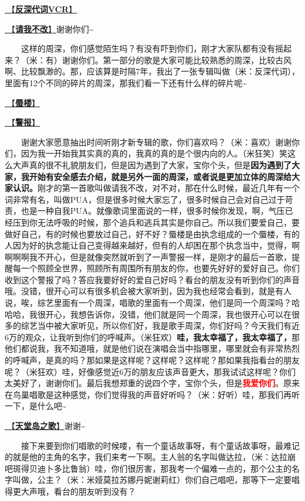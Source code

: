 \documentclass[]{ctexbook}
\begin{document}
\hyperref[senself-vcr]{🎥【\textbf{反深代词VCR}】}

\hyperref[brave-heart]{🎵【\textbf{请我不改}】}谢谢你们\textasciitilde{}

  这样的周深，你们感觉陌生吗？有没有吓到你们，刚才大家队都有没有摇起来？（米：有）谢谢你们。第一部分的歌是大家可能比较熟悉的周深，比较古风啊、比较飘渺的。那，应该算是时隔7年，我出了一张专辑叫做（米：反深代词），里面有12个不同的碎片的周深，那我们看一下还有什么样的碎片呢\textasciitilde{}

\hyperref[mirage]{🎵【\textbf{蜃楼}】}

\hyperref[the-giver]{🎵【\textbf{警报}】}

  谢谢大家愿意抽出时间听刚才新专辑的歌，你们喜欢吗？（米：喜欢）谢谢你们，因为我一开始我其实真的真的，我真的真的是个很内向的人。（米狂笑）笑这么大声真的很不礼貌朋友们，但是因为遇到了大家，宝你个头，但是\textbf{因为遇到了大家，我开始有安全感去介绍，就是另外一面的周深，或者说是更加立体的周深给大家认识。}刚才的第一首歌叫做请我不改，对不对，那在什么时候，最近几年有一个词非常有名，叫做PUA，但是很多时候大家忘了，很多时候自己会对自己过于苛责，也是一种自我PUA。就像歌词里面说的一样，很多时候你发现，啊，气压已经压到你无法呼吸的时候，那个追兵和逃兵其实是你自己。所以我们要爱自己，要做好自己，有的时候也要放过自己，好不好？蜃楼是由执念组成的一个蜃楼，有的人因为好的执念能让自己变得越来越好，但有的人却困在那个执念当中，觉得，啊啊啊啊我不开心，但是就像突然就听到了一声警报一样，是刚才的最后一首歌，提醒每一个照顾全世界，照顾所有周围所有朋友的你，也要先好好的爱好自己。你们收到这个警报了吗？答应我要好好的爱自己好吗？看台的朋友没有听到你们的声音哦。没错，很开心可以有很多机会被大家听到，因为我也经常会看到，就是有人说，唉，综艺里面有一个周深，唱歌的里面有一个周深，他们是同一个周深吗？哈哈哈，我很开心，我想告诉你，没错，他们就是同一个周深，我也很开心可以在很多的综艺当中被大家听见，所以你们好，我是歌手周深，你们好吗？今天我们有近6万的观众，让我听到你们的呼喊声。（米狂欢）\textbf{哇，我太幸福了，我太幸福了，}那他们都说我，我不知道哦，就是他们说在演唱会当中指哪里，哪里就会有非常热烈的呼喊声，是真的吗？那如果是这样呢？这样呢？这样呢？那如果我指看台的朋友呢？（米狂欢）哇，好像感觉近6万的朋友应该声音更大，那我试试这样呢？你们太美好了，谢谢你们。最后我想郑重的说四个字，宝你个头，但是\textbf{\textcolor{red}{我爱你们}}。原来在鸟巢唱歌是这种感觉，你们觉得我的声音好听吗？（米：好听）哇，那我们再听一下，是什么吧\textasciitilde{}

\hyperref[haven-song]{🎵【\textbf{天堂岛之歌}】}谢谢\textasciitilde{}

  接下来要到你们唱歌的时候喽，有一个童话故事呀，有个童话故事呀，最难记的就是他的主角的名字，我们来考一下啊。主人翁的名字叫做达拉，（米：达拉崩吧斑得贝迪卜多比鲁翁）哇，你们很厉害，那我考一个偏难一点的，那个公主的名字叫做，公主？（米：米娅莫拉苏娜丹妮谢莉红）你们自己唱吧，那等下一定要唱得更大声哦，看台的朋友听到没有？
\end{document}
